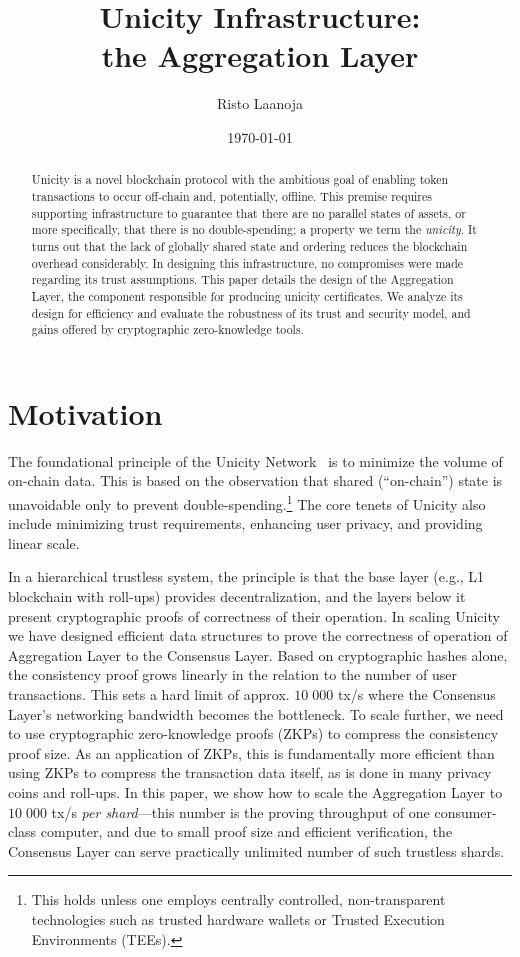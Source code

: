 \documentclass[twocolumn]{article}
\title{Unicity Infrastructure:\\
    the Aggregation Layer}
\author[1]{Risto Laanoja}
\affil[1]{Unicity Labs}
\date{\today}
\begin{document}
\maketitle

\begin{abstract}
Unicity is a novel blockchain protocol with the ambitious goal of enabling token transactions to occur off-chain and, potentially, offline. This premise requires supporting infrastructure to guarantee that there are no parallel states of assets, or more specifically, that there is no double-spending; a property we term the \textit{unicity}. It turns out that the lack of globally shared state and ordering reduces the blockchain overhead considerably. In designing this infrastructure, no compromises were made regarding its trust assumptions. This paper details the design of the Aggregation Layer, the component responsible for producing unicity certificates. We analyze its design for efficiency and evaluate the robustness of its trust and security model, and gains offered by cryptographic zero-knowledge tools.
\end{abstract}


\section{Motivation}

The foundational principle of the Unicity Network~\cite{wp} is to minimize the volume of on-chain data. This is based on the observation that shared (``on-chain'') state is unavoidable only to prevent double-spending.\footnote{This holds unless one employs centrally controlled, non-transparent technologies such as trusted hardware wallets or Trusted Execution Environments (TEEs).} The core tenets of Unicity also include minimizing trust requirements, enhancing user privacy, and providing linear scale.

In a hierarchical trustless system, the principle is that the base layer (e.g., L1 blockchain with roll-ups) provides decentralization, and the layers below it present cryptographic proofs of correctness of their operation. In scaling Unicity we have designed efficient data structures to prove the correctness of operation of Aggregation Layer to the Consensus Layer. Based on cryptographic hashes alone, the consistency proof grows linearly in the relation to the number of user transactions. This sets a hard limit of approx. $10\;000$ tx/s where the Consensus Layer's networking bandwidth becomes the bottleneck. To scale further, we need to use cryptographic zero-knowledge proofs (ZKPs) to compress the consistency proof size. As an application of ZKPs, this is fundamentally more efficient than using ZKPs to compress the transaction data itself, as is done in many privacy coins and roll-ups. In this paper, we show how to scale the Aggregation Layer to $10\;000$ tx/s \emph{per shard}---this number is the proving throughput of one consumer-class computer, and due to small proof size and efficient verification, the Consensus Layer can serve practically unlimited number of such trustless shards.
\end{document}
